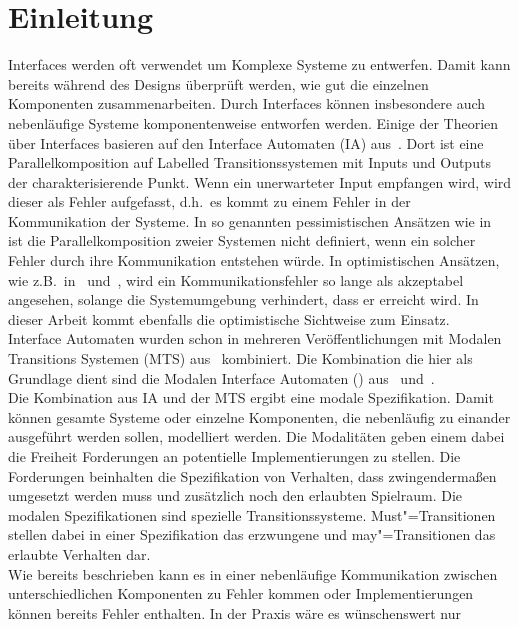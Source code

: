 \chapter{Einleitung}

Interfaces werden oft verwendet um Komplexe Systeme zu entwerfen. Damit kann
bereits während des Designs überprüft werden, wie gut die einzelnen Komponenten
zusammenarbeiten. Durch Interfaces können insbesondere auch nebenläufige
Systeme komponentenweise entworfen werden. Einige der Theorien über Interfaces
basieren auf den Interface Automaten (IA) aus~\cite{Alfaro2004}. Dort ist eine
Parallelkomposition auf Labelled Transitionssystemen mit Inputs und Outputs der
charakterisierende Punkt. Wenn ein unerwarteter Input empfangen wird, wird
dieser als Fehler aufgefasst, d.h.\ es kommt zu einem Fehler in der
Kommunikation der Systeme. In so genannten pessimistischen Ansätzen wie
in~\cite{Bauer2010} ist die Parallelkomposition zweier Systemen nicht
definiert, wenn ein solcher Fehler durch ihre Kommunikation entstehen würde. In
optimistischen Ansätzen, wie z.B.\ in~\cite{Luttgen2013MIA1}
und~\cite{Vogler2016MIA3}, wird ein Kommunikationsfehler so lange als
akzeptabel angesehen, solange die Systemumgebung verhindert, dass er erreicht
wird. In dieser Arbeit kommt ebenfalls die optimistische Sichtweise zum
Einsatz.\\
Interface Automaten wurden schon in mehreren Veröffentlichungen mit Modalen
Transitions Systemen (MTS) aus~\cite{Larsen1989} kombiniert. Die Kombination
die hier als Grundlage dient sind die Modalen Interface Automaten (\MIA{})
aus~\cite{Luttgen2013MIA1} und~\cite{Vogler2016MIA3}.\\
Die Kombination aus IA und der MTS ergibt eine modale Spezifikation. Damit
können gesamte Systeme oder einzelne Komponenten, die nebenläufig zu einander
ausgeführt werden sollen, modelliert werden. Die Modalitäten geben einem dabei
die Freiheit Forderungen an potentielle Implementierungen zu stellen. Die
Forderungen beinhalten die Spezifikation von Verhalten, dass zwingendermaßen
umgesetzt werden muss und zusätzlich noch den erlaubten Spielraum.
Die modalen Spezifikationen sind spezielle Transitionssysteme.
Must"=Transitionen stellen dabei in einer Spezifikation das erzwungene und
may"=Transitionen das erlaubte Verhalten dar.\\
Wie bereits beschrieben kann es in einer nebenläufige Kommunikation zwischen
unterschiedlichen Komponenten zu Fehler kommen oder Implementierungen können
bereits Fehler enthalten. In der Praxis wäre es wünschenswert nur

